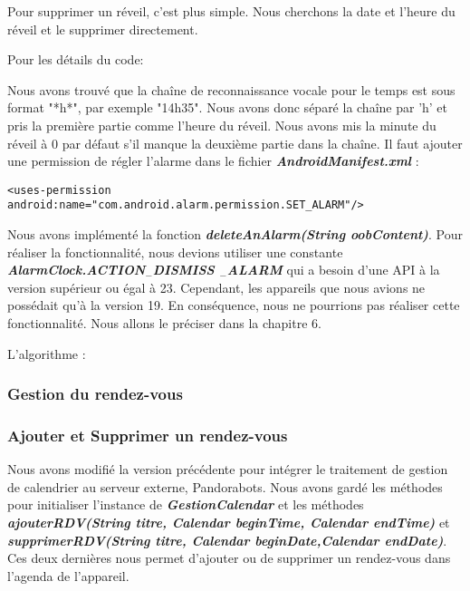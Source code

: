 \indent Pour supprimer un réveil, c'est plus simple. Nous cherchons la date et l'heure du réveil et le supprimer directement.

\indent Pour les détails du code: 

\indent Nous avons trouvé que la chaîne de reconnaissance vocale pour le temps est sous format "*h*", par exemple "14h35". Nous avons donc séparé la chaîne par 'h' et pris la première partie comme l'heure du réveil. Nous avons mis la minute du réveil à 0 par défaut s'il manque la deuxième partie dans la chaîne. Il faut ajouter une permission de régler l'alarme dans le fichier \textbf{\emph{AndroidManifest.xml}} : \\
	\begin{lstlisting}[frame=none,aboveskip=-0.5em,basicstyle=\footnotesize\bfseries]
	<uses-permission android:name="com.android.alarm.permission.SET_ALARM"/>
	\end{lstlisting}

\indent Nous avons implémenté la fonction \textbf{\emph{deleteAnAlarm(String oobContent)}}. Pour réaliser la fonctionnalité, nous devions utiliser une constante \textbf{\emph{AlarmClock.ACTION$_-$DISMISS $_-$ALARM}} qui a besoin d'une API à la version supérieur ou égal à 23. Cependant, les appareils que nous avions ne possédait qu'à la version 19. En conséquence, nous ne pourrions pas réaliser cette fonctionnalité. Nous allons le préciser dans la chapitre 6.

\indent L'algorithme :


\subsubsection{Gestion du rendez-vous}

\subsubsection*{Ajouter et Supprimer un rendez-vous}

\indent Nous avons modifié la version précédente pour intégrer le traitement de gestion de calendrier au serveur externe, Pandorabots. Nous avons gardé les méthodes pour initialiser l'instance de \textbf{\emph{GestionCalendar}} et les méthodes \textbf{\emph{ajouterRDV(String titre, Calendar beginTime, Calendar endTime)}} et \textbf{\emph{supprimerRDV(String titre, Calendar beginDate,Calendar endDate)}}. Ces deux dernières nous permet d'ajouter ou de supprimer un rendez-vous dans l'agenda de l'appareil.

